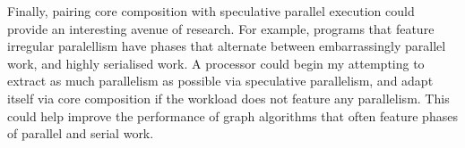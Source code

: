 Finally, pairing core composition with speculative parallel execution could provide an interesting avenue of research.
For example, programs that feature irregular paralellism have phases that alternate between embarrassingly parallel work, and highly serialised work.
A processor could begin my attempting to extract as much parallelism as possible via speculative parallelism, and adapt itself via core composition if the workload does not feature any parallelism.
This could help improve the performance of graph algorithms that often feature phases of parallel and serial work.
